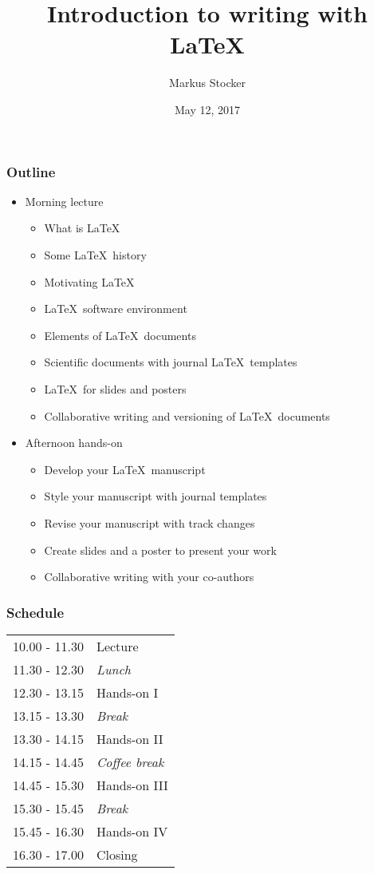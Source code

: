 \documentclass{beamer}
\title{Introduction to writing with LaTeX}
\author{Markus Stocker}
\date{May 12, 2017}
\begin{document}
\maketitle

\begin{frame}
  \frametitle{Outline}
  
  \begin{itemize}
  \item Morning lecture
  \begin{itemize}
  \item What is \LaTeX
  \item Some \LaTeX~history
  \item Motivating \LaTeX 
  \item \LaTeX~software environment
  \item Elements of \LaTeX~documents
  \item Scientific documents with journal \LaTeX~templates
  \item \LaTeX~for slides and posters
  \item Collaborative writing and versioning of \LaTeX~documents
  \end{itemize}
  \item Afternoon hands-on
  \begin{itemize}
  \item Develop your \LaTeX~manuscript
  \item Style your manuscript with journal templates
  \item Revise your manuscript with track changes
  \item Create slides and a poster to present your work
  \item Collaborative writing with your co-authors
  \end{itemize}
  \end{itemize}

\end{frame}

\begin{frame}
  \frametitle{Schedule}
  
  \begin{center}
  \begin{tabular}{ll}
  10.00 - 11.30 & Lecture \\
  11.30 - 12.30 & \emph{Lunch} \\
  12.30 - 13.15 & Hands-on I \\
  13.15 - 13.30 & \emph{Break} \\
  13.30 - 14.15 & Hands-on II \\
  14.15 - 14.45 & \emph{Coffee break} \\
  14.45 - 15.30 & Hands-on III \\
  15.30 - 15.45 & \emph{Break} \\
  15.45 - 16.30 & Hands-on IV \\
  16.30 - 17.00 & Closing
  \end{tabular}
  \end{center}

\end{frame}
\end{document}
